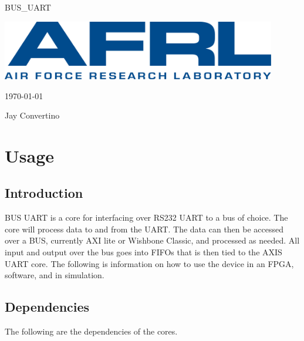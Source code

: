 \begin{titlepage}
  \begin{center}

  {\Huge BUS\_UART}

  \vspace{25mm}

  \includegraphics[width=0.90\textwidth,height=\textheight,keepaspectratio]{img/AFRL.png}

  \vspace{25mm}

  \today

  \vspace{15mm}

  {\Large Jay Convertino}

  \end{center}
\end{titlepage}

\tableofcontents

\newpage

\section{Usage}

\subsection{Introduction}

\par
BUS UART is a core for interfacing over RS232 UART to a bus of choice. The core will process data to and from the UART.
The data can then be accessed over a BUS, currently AXI lite or Wishbone Classic, and processed as needed. All input and output
over the bus goes into FIFOs that is then tied to the AXIS UART core. The following is information on how to use the device
in an FPGA, software, and in simulation.

\subsection{Dependencies}

\par
The following are the dependencies of the cores.

